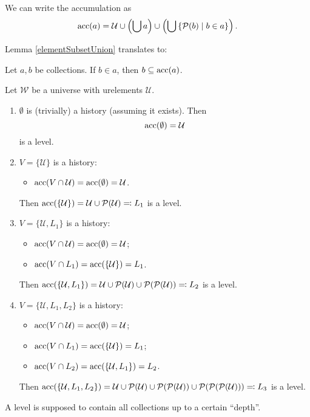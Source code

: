 We can write the accumulation as
\[ \operatorname{acc}(a) = \mathcal{U}\cup \left(\bigcup a\right) \cup \left(\bigcup\left\{ \operatorname{\mathcal{P}}(b) \;\middle|\; b\in a \right\}\right). \]

Lemma \ref{elementSubsetUnion} translates to:
\begin{lemma} \label{elementsSubsetAccumulation}
Let $a,b$ be collections. If $b\in a$, then $b\subseteq \operatorname{acc}(a)$.
\end{lemma}

\begin{example}
Let $\mathcal{W}$ be a universe with urelements $\mathcal{U}$.
\begin{enumerate}
\item $\emptyset$ is (trivially) a history (assuming it exists). Then
\[ \operatorname{acc}(\emptyset) = \mathcal{U} \]
is a level.
\item $V = \{\mathcal{U}\}$ is a history:
\begin{itemize}
\item $\operatorname{acc}(V\cap \mathcal{U}) = \operatorname{acc}(\emptyset) = \mathcal{U}$.
\end{itemize}
Then $\operatorname{acc}(\{\mathcal{U}\}) = \mathcal{U}\cup \operatorname{\mathcal{P}}(\mathcal{U}) \eqqcolon L_1$ is a level.
\item $V = \{\mathcal{U}, L_1\}$ is a history:
\begin{itemize}
\item $\operatorname{acc}(V \cap \mathcal{U}) = \operatorname{acc}(\emptyset) = \mathcal{U}$;
\item $\operatorname{acc}(V \cap L_1) = \operatorname{acc}(\{\mathcal{U}\}) = L_1$.
\end{itemize}
Then $\operatorname{acc}(\{\mathcal{U}, L_1\}) = \mathcal{U}\cup \operatorname{\mathcal{P}}(\mathcal{U})\cup \operatorname{\mathcal{P}}(\operatorname{\mathcal{P}}(\mathcal{U})) \eqqcolon L_2$ is a level.
\item $V = \{\mathcal{U}, L_1, L_2\}$ is a history:
\begin{itemize}
\item $\operatorname{acc}(V \cap \mathcal{U}) = \operatorname{acc}(\emptyset) = \mathcal{U}$;
\item $\operatorname{acc}(V \cap L_1) = \operatorname{acc}(\{\mathcal{U}\}) = L_1$;
\item $\operatorname{acc}(V \cap L_2) = \operatorname{acc}(\{\mathcal{U}, L_1\}) = L_2$.
\end{itemize}
Then $\operatorname{acc}(\{\mathcal{U}, L_1, L_2\}) = \mathcal{U}\cup \operatorname{\mathcal{P}}(\mathcal{U})\cup \operatorname{\mathcal{P}}(\operatorname{\mathcal{P}}(\mathcal{U}))\cup \operatorname{\mathcal{P}}(\operatorname{\mathcal{P}}(\operatorname{\mathcal{P}}(\mathcal{U}))) \eqqcolon L_3$ is a level.
\end{enumerate}
\end{example}

A level is supposed to contain all collections up to a certain ``depth''.

